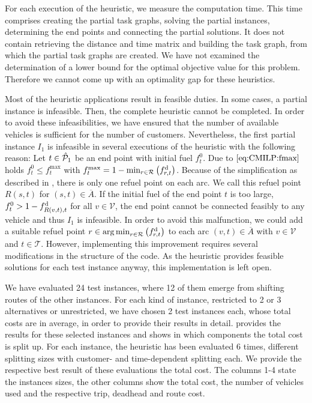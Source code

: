 For each execution of the heuristic, we measure the computation time. This time comprises creating the partial task graphs, solving the partial instances, determining the end points and connecting the partial solutions. It does not contain retrieving the distance and time matrix and building the task graph, from which the partial task graphs are created. We have not examined the determination of a lower bound for the optimal objective value for this problem. Therefore we cannot come up with an optimality gap for these heuristics.

Most of the heuristic applications result in feasible duties. In some cases, a partial instance is infeasible. Then, the complete heuristic cannot be completed. In order to avoid these infeasibilities, we have ensured that the number of available vehicles is sufficient for the number of customers. Nevertheless, the first partial instance $I_1$ is infeasible in several executions of the heuristic with the following reason: Let $t\in\hat{\mathcal{P}}_1$ be an end point with initial fuel $f^0_t$. Due to $\eqref{eq:CMILP:fmax}$ holds ${f^0_t\leq f^{\max}_t}$ with ${f^{\max}_t = 1 - \min_{r\in\mathcal{R}}\left(f^{\operatorname{d}}_{r,t}\right)}$. Because of the simplification as described in , there is only one refuel point on each arc. We call this refuel point $R(s,t)$ for ${(s,t)\in\overline{A}}$. If the initial fuel of the end point $t$ is too large, \ie ${f^0_t > 1 - f^{\operatorname{d}}_{R(v,t),t}}$ for all ${v\in\mathcal{V}}$, the end point cannot be connected feasibly to any vehicle and thus $I_1$ is infeasible. In order to avoid this malfunction, we could add a suitable refuel point ${r\in\operatorname*{arg\,min}_{r\in\mathcal{R}}\left(f^{\operatorname{d}}_{r,t}\right)}$ to each arc ${(v,t)\in\overline{A}}$ with ${v\in\mathcal{V}}$ and ${t\in\mathcal{T}}$. However, implementing this improvement requires several modifications in the structure of the code. As the heuristic provides feasible solutions for each test instance anyway, this implementation is left open.

We have evaluated 24 test instances, where 12 of them emerge from shifting routes of the other instances. For each kind of instance, \ie restricted to 2 or 3 alternatives or unrestricted, we have chosen 2 test instances each, whose total costs are in average, in order to provide their results in detail.  provides the results for these selected instances and shows in which components the total cost is split up. For each instance, the heuristic has been evaluated 6 times,  different splitting sizes with customer- and time-dependent splitting each. We provide the respective best result of these evaluations \wrt the total cost. The columns 1-4 state the instances sizes, the other columns show the total cost, the number of vehicles used and the respective trip, deadhead and route cost.

